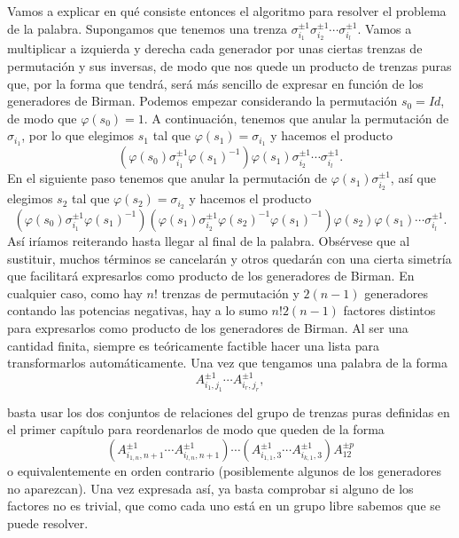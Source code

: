 \documentclass[TFG.tex]{subfiles}
\begin{document}
Vamos a explicar en qué consiste entonces el algoritmo para resolver el problema de la palabra. Supongamos que tenemos una trenza $\sigma_{i_1}^{\pm 1}\sigma_{i_2}^{\pm 1}\cdots\sigma_{i_l}^{\pm 1}$. Vamos a multiplicar a izquierda y derecha cada generador por unas ciertas trenzas de permutación y sus inversas, de modo que nos quede un producto de trenzas puras que, por la forma que tendrá, será más sencillo de expresar en función de los generadores de Birman. Podemos empezar considerando la permutación $s_0=Id$, de modo que $\varphi(s_0)=1$. A continuación, tenemos que anular la permutación de $\sigma_{i_1}$, por lo que elegimos $s_1$ tal que $\varphi(s_1)=\sigma_{i_1}$ y hacemos el producto
\[
(\varphi(s_0)\sigma_{i_1}^{\pm 1}\varphi(s_1)^{-1})\varphi(s_1)\sigma_{i_2}^{\pm 1}\cdots\sigma_{i_l}^{\pm 1}.
\]
En el siguiente paso tenemos que anular la permutación de $\varphi(s_1)\sigma_{i_2}^{\pm 1}$, así que elegimos $s_2$ tal que $\varphi(s_2)=\sigma_{i_2}$ y hacemos el producto
\[
(\varphi(s_0)\sigma_{i_1}^{\pm 1}\varphi(s_1)^{-1})(\varphi(s_1)\sigma_{i_2}^{\pm 1}\varphi(s_2)^{-1}\varphi(s_1)^{-1})\varphi(s_2)\varphi(s_1)\cdots\sigma_{i_l}^{\pm 1}.
\]
Así iríamos reiterando hasta llegar al final de la palabra. Obsérvese que al sustituir, muchos términos se cancelarán y otros quedarán con una cierta simetría que facilitará expresarlos como producto de los generadores de Birman. En cualquier caso, como hay $n!$ trenzas de permutación y $2(n-1)$ generadores contando las potencias negativas, hay a lo sumo $n!2(n-1)$ factores distintos para expresarlos como producto de los generadores de Birman. Al ser una cantidad finita, siempre es teóricamente factible hacer una lista para transformarlos automáticamente. Una vez que tengamos una palabra de la forma
\[
A_{i_1,j_1}^{\pm 1}\cdots A_{i_r,j_r}^{\pm 1},
\]

basta usar los dos conjuntos de relaciones del grupo de trenzas puras definidas en el primer capítulo para reordenarlos de modo que queden de la forma
\[
(A_{i_{1,n},n+1}^{\pm 1}\cdots A_{i_{l,n},n+1}^{\pm 1})\cdots(A_{i_{1,1},3}^{\pm 1}\cdots A_{i_{k,1},3}^{\pm 1}) A_{12}^{\pm p}
\]
o equivalentemente en orden contrario (posiblemente algunos de los generadores no aparezcan). Una vez expresada así, ya basta comprobar si alguno de los factores no es trivial, que como cada uno está en un grupo libre sabemos que se puede resolver.
\end{document}
